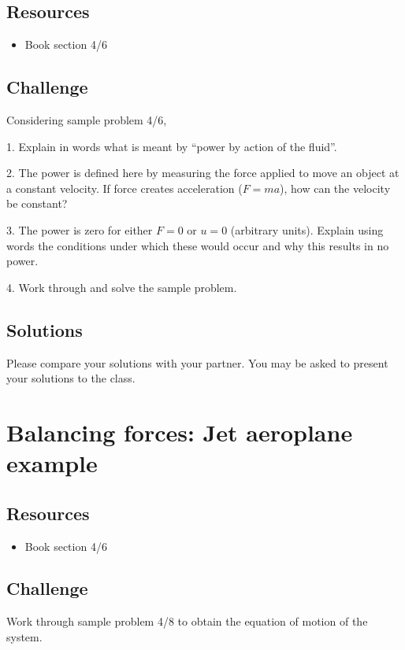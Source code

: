 \subsection*{Resources}
\begin{itemize}
    \item Book section 4/6
\end{itemize}

\subsection*{Challenge}
Considering sample problem 4/6,

1. Explain in words what is meant by ``power by action of the fluid''.

2. The power is defined here by measuring the force applied to move an object at a constant velocity. If force creates acceleration ($F=ma$), how can the velocity be constant?

3. The power is zero for either $F=0$ or $u=0$ (arbitrary units). Explain using words the conditions under which these would occur and why this results in no power.

4. Work through and solve the sample problem.

\subsection*{Solutions}
Please compare your solutions with your partner. You may be asked to present your solutions to the class.




\newpage
\section{Balancing forces: Jet aeroplane example}

\subsection*{Resources}
\begin{itemize}
    \item Book section 4/6
\end{itemize}

\subsection*{Challenge}
Work through sample problem 4/8 to obtain the equation of motion of the system.




